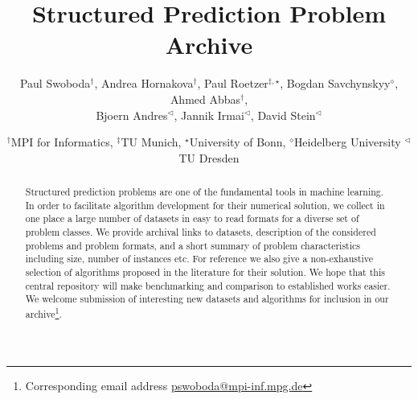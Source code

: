 \documentclass[twocolumn]{article}
\title{Structured Prediction Problem Archive}
\author{Paul Swoboda$^\dagger$, Andrea Hornakova$^\dagger$, Paul Roetzer$^{\ddagger,\star}$, Bogdan Savchynskyy$^{\diamond}$, Ahmed Abbas$^\dagger$, \\Bjoern Andres$^{\triangleleft}$, Jannik Irmai$^\triangleleft$, David Stein$^\triangleleft$}
\date{%
$^\dagger$MPI for Informatics, %
$^\ddagger$TU Munich, %
$^\star$University of Bonn, %
$^\diamond$Heidelberg University %
$^\triangleleft$TU Dresden %
}
\begin{document}
\maketitle

\begin{abstract}
Structured prediction problems are one of the fundamental tools in machine learning.
In order to facilitate algorithm development for their numerical solution, we collect in one place a large number of datasets in easy to read formats for a diverse set of problem classes.
We provide archival links to datasets, description of the considered problems and problem formats, and a short summary of problem characteristics including size, number of instances etc.
For reference we also give a non-exhaustive selection of algorithms proposed in the literature for their solution.
We hope that this central repository will make benchmarking and comparison to established works easier.
    We welcome submission of interesting new datasets and algorithms for inclusion in our archive\footnote{Corresponding email address \href{mailto:pswoboda@mpi-inf.mpg.de}{pswoboda@mpi-inf.mpg.de}}.
\end{abstract}

\tableofcontents

\clearpage



\clearpage

\clearpage

%
\clearpage

\clearpage

\clearpage

\clearpage

\clearpage

\clearpage

\clearpage

\clearpage

\clearpage

\clearpage


{\small


} 

\end{document}
